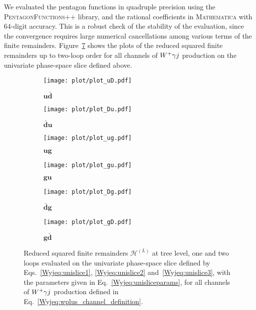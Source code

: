 \documentclass[main.tex]{subfiles}
\begin{document}
We evaluated the pentagon functions in quadruple precision using the \textsc{PentagonFunctions++} library, and the rational coefficients in \textsc{Mathematica} with $64$-digit accuracy.
This is a robust check of the stability of the evaluation, since the convergence requires large numerical cancellations among various terms of the finite remainders. 
Figure~\ref{Wyjfig:plots} shows the plots of the reduced squared finite remainders up to two-loop order for all channels of $W^+\gamma j$ production on the univariate phase-space slice defined above. 
%
\begin{figure}[t!]
\centering
\begin{subfigure}{.5\textwidth}
    \centering
    \texttt{[image: plot/plot\_uD.pdf]}
    \label{Wyjfig:uD}
    \caption{$\mathbf{u\bar{d}}$}
\end{subfigure}%
\begin{subfigure}{.5\textwidth}
    \centering
    \texttt{[image: plot/plot\_Du.pdf]}
    \label{Wyjfig:Du}
    \caption{$\mathbf{\bar{d}u}$}
\end{subfigure}
\begin{subfigure}{.5\textwidth}
    \centering
    \texttt{[image: plot/plot\_ug.pdf]}
    \label{Wyjfig:ug}
    \caption{$\mathbf{ug}$}
\end{subfigure}%
\begin{subfigure}{.5\textwidth}
    \centering
    \texttt{[image: plot/plot\_gu.pdf]}
    \label{Wyjfig:gu}
    \caption{$\mathbf{gu}$}
\end{subfigure}
\begin{subfigure}{.5\textwidth}
    \centering
    \texttt{[image: plot/plot\_Dg.pdf]}
    \label{Wyjfig:Dg}
    \caption{$\mathbf{\bar{d}g}$}
\end{subfigure}%
\begin{subfigure}{.5\textwidth}
    \centering
    \texttt{[image: plot/plot\_gD.pdf]}
    \label{Wyjfig:gD}
    \caption{$\mathbf{g\bar{d}}$}
\end{subfigure}
\caption[short]{Reduced squared finite remainders $\mathcal{H}^{(L)}$ at tree level, one and two loops evaluated on the univariate phase-space slice defined by Eqs.~\eqref{Wyjeq:unislice1}, \eqref{Wyjeq:unislice2} and~\eqref{Wyjeq:unislice3}, with the parameters given in Eq.~\eqref{Wyjeq:unisliceparams}, for all channels of $W^+\gamma j$ production defined in Eq.~\eqref{Wyjeq:wplus_channel_definition}.}
\label{Wyjfig:plots}
\end{figure}
\end{document}
